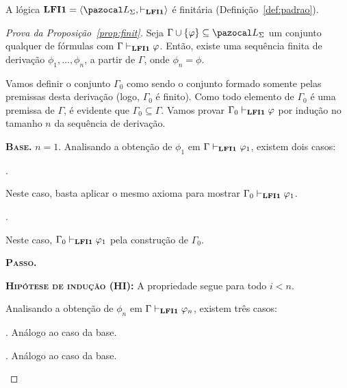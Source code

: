         
        \begin{proposicao}\label{prop:finit}        
            A lógica $\lfium{} = \langle \ling, \conhil \rangle$ é finitária (Definição~\ref{def:padrao}).
        \end{proposicao}

        \begin{proof}[Prova da Proposição~\ref{prop:finit}]
            Seja $\Gamma \cup \{\phi\} \subseteq \ling{}$ um conjunto qualquer de fórmulas com $\Gamma \vdash_{{\normalfont\textbf{LFI1}}{}} \varphi$. Então, existe uma sequência finita de derivação $\phi_1, \ldots, \phi_n$, a partir de $\Gamma$, onde $\phi_n = \phi$. 
            
            Vamos definir o conjunto $\Gamma_0$ como sendo o conjunto formado somente pelas premissas desta derivação (logo, $\Gamma_0$ é finito). Como todo elemento de $\Gamma_0$ é uma premissa de $\Gamma$, é evidente que $\Gamma_0 \subseteq \Gamma$. Vamos provar $\Gamma_0 \vdash_{{\normalfont\textbf{LFI1}}{}} \varphi$ por indução no tamanho $n$ da sequência de derivação.


            \begin{adjustwidth}{1cm}{}

                \textbf{\textsc{Base.}} $n = 1$.
                Analisando a obtenção de $\phi_1$ em $\Gamma \vdash_{{\normalfont\textbf{LFI1}}{}} \varphi_1$, existem dois casos:
                \begin{provaporcasos}
                    . 
                    
                        Neste caso, basta aplicar o mesmo axioma para mostrar $\Gamma_0 \vdash_{{\normalfont\textbf{LFI1}}{}} \varphi_1$.
        
                    \casodeprova{$\phi_1 \in \Gamma$}. 
                    
                        Neste caso, $\Gamma_0 \vdash_{{\normalfont\textbf{LFI1}}{}} \varphi_1$ pela construção de $\Gamma_0$.
                \end{provaporcasos}

                \noindent\textbf{\textsc{Passo.}} 
                
                \noindent \textbf{\textsc{Hipótese de indução (HI):}} A propriedade segue para todo $i < n$.

                Analisando a obtenção de $\phi_n$ em $\Gamma \vdash_{{\normalfont\textbf{LFI1}}{}} \varphi_n$, existem três casos:
                \begin{provaporcasos}
                    . Análogo ao caso da base.
        
                    . Análogo ao caso da base.


\end{provaporcasos}
\end{adjustwidth}
\end{proof}
